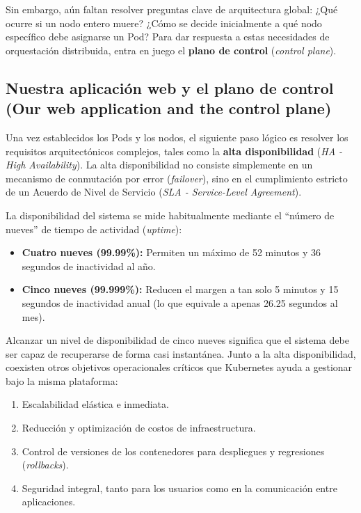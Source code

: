 Sin embargo, aún faltan resolver preguntas clave de arquitectura global: ¿Qué ocurre si un nodo entero muere? ¿Cómo se decide inicialmente a qué nodo específico debe asignarse un Pod? Para dar respuesta a estas necesidades de orquestación distribuida, entra en juego el \textbf{plano de control} (\textit{control plane}).

\subsection{Nuestra aplicación web y el plano de control (Our web application and the control plane)}

Una vez establecidos los Pods y los nodos, el siguiente paso lógico es resolver los requisitos arquitectónicos complejos, tales como la \textbf{alta disponibilidad} (\textit{HA - High Availability}). La alta disponibilidad no consiste simplemente en un mecanismo de conmutación por error (\textit{failover}), sino en el cumplimiento estricto de un Acuerdo de Nivel de Servicio (\textit{SLA - Service-Level Agreement}). 

La disponibilidad del sistema se mide habitualmente mediante el ``número de nueves'' de tiempo de actividad (\textit{uptime}):
\begin{itemize}
    \item \textbf{Cuatro nueves (99.99\%):} Permiten un máximo de 52 minutos y 36 segundos de inactividad al año.
    \item \textbf{Cinco nueves (99.999\%):} Reducen el margen a tan solo 5 minutos y 15 segundos de inactividad anual (lo que equivale a apenas 26.25 segundos al mes).
\end{itemize}

Alcanzar un nivel de disponibilidad de cinco nueves significa que el sistema debe ser capaz de recuperarse de forma casi instantánea. Junto a la alta disponibilidad, coexisten otros objetivos operacionales críticos que Kubernetes ayuda a gestionar bajo la misma plataforma:
\begin{enumerate}
    \item Escalabilidad elástica e inmediata.
    \item Reducción y optimización de costos de infraestructura.
    \item Control de versiones de los contenedores para despliegues y regresiones (\textit{rollbacks}).
    \item Seguridad integral, tanto para los usuarios como en la comunicación entre aplicaciones.
\end{enumerate}

